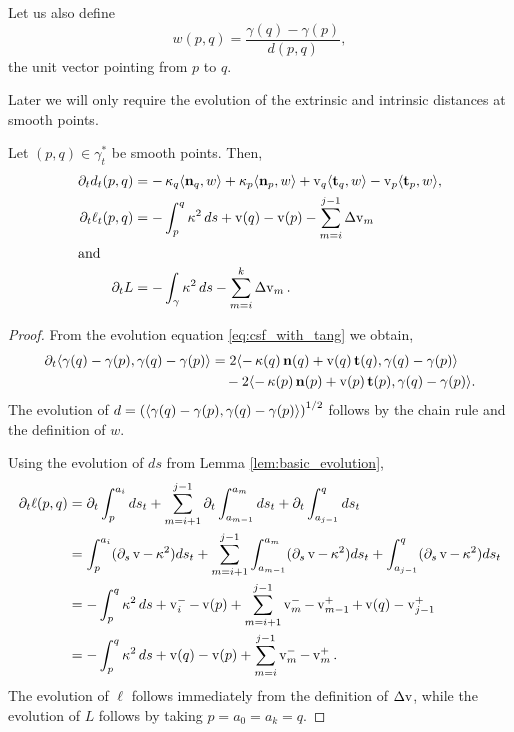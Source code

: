 \documentclass[11pt]{amsart}
\begin{document}
Let us also define
\begin{equation}
\label{eq:w}
w(p, q) = \frac{\gamma(q) - \gamma(p)}{d(p,q)},
\end{equation}
the unit vector pointing from \(p\) to \(q\).

Later we will only require the evolution of the extrinsic and intrinsic distances at smooth points.

\begin{lemma}
\label{lem:distance_evolution}

Let \((p,q) \in \gamma_t^{\ast}\) be smooth points. Then,
\begin{align*}
\partial_t d_t(p, q) &= -\operatorname{\kappa}_q \langle{\operatorname{\mathbf{n}}_q},{w}\rangle + \operatorname{\kappa}_p \langle{\operatorname{\mathbf{n}}_p},{w}\rangle + \operatorname{v}_q \langle{\operatorname{\mathbf{t}}_q},{w}\rangle - \operatorname{v}_p \langle{\operatorname{\mathbf{t}}_p},{w}\rangle, \\
\partial_t \ell_t(p, q) &= - \int_p^q \operatorname{\kappa}^2 ds + \operatorname{v}(q) - \operatorname{v}(p) - \sum_{m=i}^{j-1} \operatorname{{\Delta v}}_m \\
\intertext{and}
\partial_t L &= - \int_{\gamma} \operatorname{\kappa}^2 ds - \sum_{m=i}^{k} \operatorname{{\Delta v}}_m.
\end{align*}
\end{lemma}

\begin{proof}
From the evolution equation \eqref{eq:csf_with_tang} we obtain,
\[
\begin{split}
\partial_t \langle{\gamma(q) - \gamma(p)},{\gamma(q) - \gamma(p)}\rangle &= 2 \langle{-\operatorname{\kappa}(q) \operatorname{\mathbf{n}}(q) + \operatorname{v}(q) \operatorname{\mathbf{t}}(q)},{\gamma(q) - \gamma(p)}\rangle \\
&\quad  - 2 \langle{-\operatorname{\kappa}(p) \operatorname{\mathbf{n}}(p) + \operatorname{v}(p) \operatorname{\mathbf{t}}(p)},{\gamma(q) - \gamma(p)}\rangle.
\end{split}
\]
The evolution of \(d = \left(\langle{\gamma(q) - \gamma(p)},{\gamma(q) - \gamma(p)}\rangle\right)^{1/2}\) follows by the chain rule and the definition of \(w\).

Using the evolution of \(ds\) from Lemma \ref{lem:basic_evolution},
\begin{align*}
\partial_t \ell(p,q) &= \partial_t \int_p^{a_i} ds_t + \sum_{m=i+1}^{j-1} \partial_t \int_{a_{m-1}}^{a_m} ds_t + \partial_t  \int_{a_{j-1}}^q ds_t \\
&= \int_p^{a_i} (\partial_s \operatorname{v} - \operatorname{\kappa}^2 )ds_t + \sum_{m=i+1}^{j-1} \int_{a_{m-1}}^{a_m} (\partial_s \operatorname{v} - \operatorname{\kappa}^2 )ds_t + \int_{a_{j-1}}^q (\partial_s \operatorname{v} - \operatorname{\kappa}^2) ds_t \\
&= -\int_p^q \operatorname{\kappa}^2 ds + \operatorname{v}_i^- - \operatorname{v}(p) + \sum_{m=i+1}^{j-1} \operatorname{v}_m^- - \operatorname{v}_{m-1}^+ + \operatorname{v}(q) - \operatorname{v}_{j-1}^+ \\
&= -\int_p^q \operatorname{\kappa}^2 ds + \operatorname{v}(q) - \operatorname{v}(p) + \sum_{m=i}^{j-1} \operatorname{v}_m^- - \operatorname{v}_m^+.
\end{align*}
The evolution of \(\ell\) follows immediately from the definition of \(\operatorname{{\Delta v}}\), while the evolution of \(L\) follows by taking \(p=a_0=a_k=q\).
\end{proof}
\end{document}
